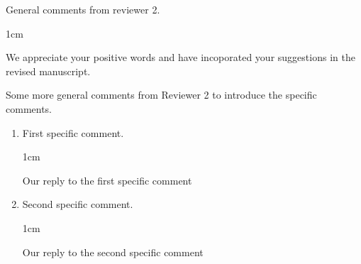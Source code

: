 \documentclass[11pt]{article}
\newenvironment{reply}{%
    \begin{adjustwidth}{1cm}{}
    \color{gray}%
}{%
    \end{adjustwidth}
}
\begin{document}
General comments from reviewer 2.

\begin{reply}
    We appreciate your positive words and have incoporated your suggestions in the revised manuscript.
\end{reply}

Some more general comments from Reviewer 2 to introduce the specific comments.

\begin{enumerate}[parsep=0.5em]
    \item First specific comment.
    \begin{reply}
        Our reply to the first specific comment
    \end{reply}

    \item Second specific comment.
    \begin{reply}
        Our reply to the second specific comment
    \end{reply}
\end{enumerate}
\end{document}
